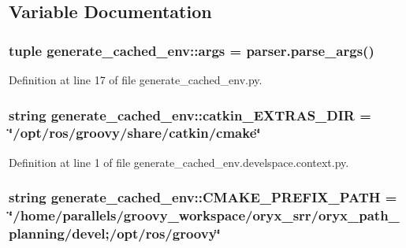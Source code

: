 \subsection{\-Variable \-Documentation}
\subsubsection[{args}]{\setlength{\rightskip}{0pt plus 5cm}tuple {\bf generate\-\_\-cached\-\_\-env\-::args} = parser.\-parse\-\_\-args()}\label{namespacegenerate__cached__env_a75c6158373e6fcee899e1337b8c59ad5}


\-Definition at line 17 of file generate\-\_\-cached\-\_\-env.\-py.

\subsubsection[{catkin\-\_\-\-E\-X\-T\-R\-A\-S\-\_\-\-D\-I\-R}]{\setlength{\rightskip}{0pt plus 5cm}string {\bf generate\-\_\-cached\-\_\-env\-::catkin\-\_\-\-E\-X\-T\-R\-A\-S\-\_\-\-D\-I\-R} = \char`\"{}/opt/ros/groovy/share/catkin/cmake\char`\"{}}\label{namespacegenerate__cached__env_a9c24e1b675ff632367a8b8f71cdccf13}


\-Definition at line 1 of file generate\-\_\-cached\-\_\-env.\-develspace.\-context.\-py.

\subsubsection[{\-C\-M\-A\-K\-E\-\_\-\-P\-R\-E\-F\-I\-X\-\_\-\-P\-A\-T\-H}]{\setlength{\rightskip}{0pt plus 5cm}string {\bf generate\-\_\-cached\-\_\-env\-::\-C\-M\-A\-K\-E\-\_\-\-P\-R\-E\-F\-I\-X\-\_\-\-P\-A\-T\-H} = \char`\"{}/home/parallels/groovy\-\_\-workspace/oryx\-\_\-srr/oryx\-\_\-path\-\_\-planning/devel;/opt/ros/groovy\char`\"{}}\label{namespacegenerate__cached__env_a5febf1390e491671a2bd270eb18aaec9}


